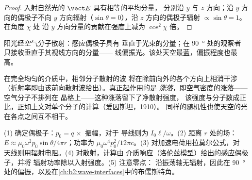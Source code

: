 \begin{proof}
入射自然光的 $\vect E$ 具有相等的平均分量，
分别沿 $y$ 与 $z$ 方向；沿 $y$ 方向的偶极子不向 $y$ 方向辐射（$\sin
\theta = 0$），沿 $z$ 方向的偶极子辐射 $\propto\sin\theta = 1$。在角度 $\chi$ 处
沿 $y$ 方向分量的贡献在强度上减为 $\cos^2\chi$ 倍。
\end{proof}

\begin{omfigure}

{\small 阳光经空气分子散射：感应偶极子具有
垂直于光束的分量；在 \qty{90}{\degree} 处的观察者
只接收垂直于其视线方向的分量——
线偏振光。该处天空最蓝，偏振程度也最高。}
\end{omfigure}

\begin{remark}[蓝光为何能到达我们]\label{rem:b2:dipole-radiation:why}
在完全均匀的介质中，相邻分子散射的波
将在除前向外的各个方向上相消干涉
（折射率即由该前向散射波给出）。真正起作用的是
\emph{涨落}，即空气密度的涨落——空气分子不排列在
晶格上——这种涨落留下了净散射强度，
该强度与分子数成正比，正如上文对单个分子的计算（爱因斯坦，1910）。
同样的随机性也使天空的光在各点之间互不相干。
\end{remark}

\begin{method}[辐射估算]\label{met:b2:dipole-radiation:method}
(1) 确定偶极子：$p_0 = q\,\times$ 振幅，对于
导线则为 $I_0\ell/\omega$。(2) 距离 $r$ 处的场：$E \approx \mu_0\omega^2p_0\sin\theta/4\pi r$；功率为
$\mu_0\omega^4p_0^2/12\pi c$。(3) 对加速电荷用拉莫尔公式，对
天线则用辐射电阻。(4) 对散射，计算由
介质响应（洛伦兹模型）给出的感应偶极子，并将
辐射功率除以入射强度。(5) 注意零点：
沿振荡轴无辐射，因此在
\qty{90}{\degree} 处的偏振，以及在\cref{ch:b2:wave-interfaces}中的布儒斯特角。
\end{method}

